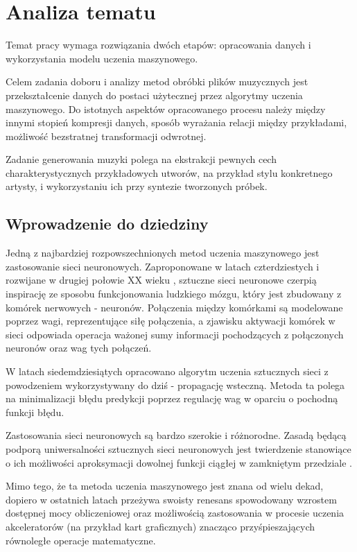 \chapter{Analiza tematu}
{
  Temat pracy wymaga rozwiązania dwóch etapów: opracowania danych i wykorzystania modelu
  uczenia maszynowego.

  Celem zadania doboru i analizy metod obróbki plików muzycznych jest 
  przekształcenie danych do postaci użytecznej przez algorytmy uczenia maszynowego.
  Do istotnych aspektów opracowanego procesu należy między innymi stopień kompresji danych,
  sposób wyrażania relacji między przykładami, możliwość bezstratnej transformacji odwrotnej. 

  Zadanie generowania muzyki polega na ekstrakcji pewnych cech charakterystycznych
  przykładowych utworów, na przykład stylu konkretnego artysty, 
  i wykorzystaniu ich przy syntezie tworzonych próbek. 

  \section{Wprowadzenie do dziedziny}
  {
    Jedną z najbardziej rozpowszechnionych metod uczenia maszynowego jest zastosowanie sieci neuronowych.
    Zaproponowane w latach czterdziestych i rozwijane w drugiej połowie XX wieku \cite{McCulloch1943}, sztuczne sieci neuronowe
    czerpią inspirację ze sposobu funkcjonowania ludzkiego mózgu, który jest zbudowany z komórek nerwowych - neuronów.
    Połączenia między komórkami są modelowane poprzez wagi, reprezentujące siłę połączenia, a zjawisku aktywacji
    komórek w sieci odpowiada operacja ważonej sumy informacji pochodzących z połączonych neuronów oraz wag tych połączeń.
    
    W latach siedemdziesiątych opracowano algorytm uczenia sztucznych sieci z powodzeniem wykorzystywany
    do dziś - propagację wsteczną. Metoda ta polega na minimalizacji błędu predykcji poprzez regulację
    wag w oparciu o pochodną funkcji błędu.

    Zastosowania sieci neuronowych są bardzo szerokie i różnorodne. Zasadą będącą podporą uniwersalności 
    sztucznych sieci neuronowych jest twierdzenie stanowiące o ich możliwości aproksymacji dowolnej 
    funkcji ciągłej w zamkniętym przedziale \cite{Csji2001ApproximationWA}.

    Mimo tego, że ta metoda uczenia maszynowego jest znana od wielu dekad, dopiero w ostatnich latach
    przeżywa swoisty renesans spowodowany wzrostem dostępnej mocy obliczeniowej oraz 
    możliwością zastosowania w procesie uczenia akceleratorów (na przykład kart graficznych) znacząco 
    przyśpieszających równoległe operacje matematyczne.


}}
